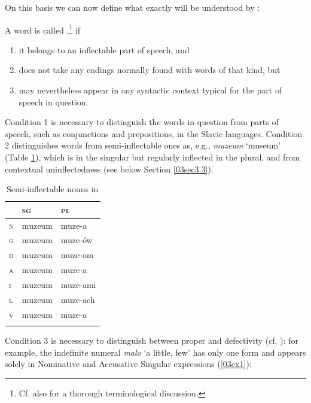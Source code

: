\documentclass[output=paper,colorlinks,citecolor=brown]{langscibook}
\begin{document}
On this basis we can now define what exactly will be understood by \textit{}:

A word is called ,\footnote{Cf. also \citet[24--35]{krzyzanowski2013} for a thorough terminological discussion.} if

\begin{enumerate}
	\item it belongs to an inflectable part of speech, and
	
	\item does not take any endings normally found with words of that kind, but
	
	\item may nevertheless appear in any syntactic context typical for the part of speech in question.
\end{enumerate}

Condition 1 is necessary to distinguish the words in question from  parts of speech, such as conjunctions and prepositions, in the Slavic languages. Condition 2 distinguishes  words from semi-inflectable ones as, e.g.,  \emph{muzeum} `museum' (Table \ref{03tab2}), which is  in the singular but regularly inflected in the plural, and from contextual uninflectedness (see below Section \ref{03sec3.3}).

\begin{table}[ht]
	\centering
	\begin{tabularx}{0.4\textwidth}{p{0.5cm}XX}
		\lsptoprule
		& \textsc{sg} & \textsc{pl} \\
		\midrule
		\textsc{n} & muzeum & muze-a \\
		\textsc{g} & muzeum & muze-ów \\
		\textsc{d} & muzeum & muze-om \\
		\textsc{a} & muzeum & muze-a \\
		\textsc{i} & muzeum & muze-ami \\
		\textsc{l} & muzeum & muze-ach \\
		\textsc{v} & muzeum & muze-a \\
		\lspbottomrule
	\end{tabularx}
	\caption{Semi-inflectable nouns in }
	\label{03tab2}
\end{table}

Condition 3 is necessary to distinguish between  proper and defectivity (cf. \citealt{doleschal2000, doleschal2002-mici, spencer2020}): for example, the  indefinite numeral \emph{malo} `a little, few' has only one form and appears solely in Nominative and Accusative Singular expressions (\ref{03ex1}):
\end{document}
